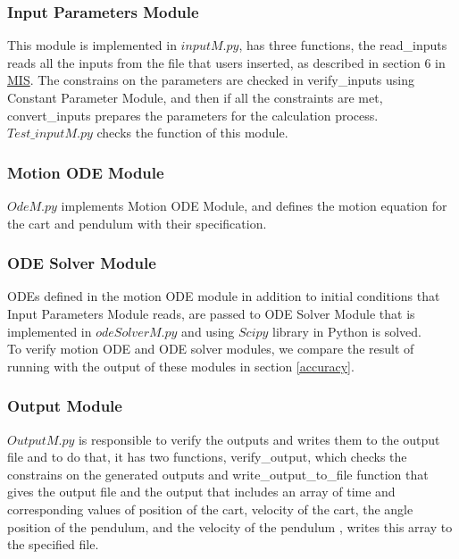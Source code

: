 \documentclass[12pt, titlepage]{article}
\begin{document}
\subsubsection{Input Parameters Module}\label{param}
This module is implemented in \href{https://github.com/MinMah23/CAS741-Project/blob/main/src/inputM.py}{$inputM.py$}, has three functions, the read\_inputs reads all the inputs from the file that users inserted, as described in section 6 in \href{https://github.com/MinMah23/CAS741-Project/tree/main/docs/Design/SoftDetailedDes}{MIS}. The constrains on the parameters are checked in verify\_inputs using Constant Parameter Module, and then if all the constraints are met, convert\_inputs prepares the parameters for the calculation process. \href{https://github.com/MinMah23/CAS741-Project/blob/main/test/test_inputM.py}{$Test\_inputM.py$} checks the function of this module.\\

\subsubsection{Motion ODE Module}\label{ode}
 \href{https://github.com/MinMah23/CAS741-Project/blob/main/src/odeM.py}{$OdeM.py$} implements Motion ODE Module, and defines the motion equation for the cart and pendulum with their specification.\\
 
\subsubsection{ODE Solver Module}\label{odeS}
ODEs defined in the motion ODE module in addition to initial conditions that Input Parameters Module reads, are passed to ODE Solver Module that is implemented in \href{https://github.com/MinMah23/CAS741-Project/blob/main/src/odeSolverM.py}{$odeSolverM.py$} and using $Scipy$ library in Python is solved.\\
To verify motion ODE and ODE solver modules, we compare the result of running \cite{al-khazraji_2022} with the output of these modules in section \ref{accuracy}.\\

\subsubsection{Output Module}\label{output}
 \href{https://github.com/MinMah23/CAS741-Project/blob/main/src/outputM.py}{$OutputM.py$} is responsible to verify the outputs and writes them to the output file and to do that, it has two functions, verify\_output, which checks the constrains on the generated outputs and write\_output\_to\_file function that gives the output file and the output that includes an array of time and corresponding values of position of the cart, velocity of the cart, the angle position of the pendulum, and the velocity of the pendulum , writes this array to the specified file.\\
 
\end{document}
